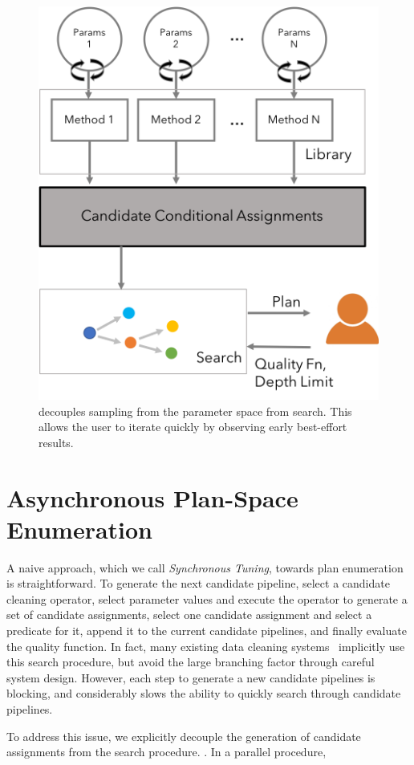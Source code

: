\begin{figure}[t]
\centering
 \includegraphics[width=0.7\columnwidth]{figures/architecture.png}
 \caption{\small \sys decouples sampling from the parameter space from search. This allows the user to iterate quickly by observing early best-effort results. \label{fig:arch}}
\end{figure}

\section{Asynchronous Plan-Space Enumeration}


A naive approach, which we call {\it Synchronous Tuning}, towards plan enumeration is straightforward.  To generate the next candidate pipeline, select a candidate cleaning operator, select parameter values and execute the operator to generate a set of candidate assignments, select one candidate assignment and select a predicate for it, append it to the current candidate pipelines, and finally evaluate the quality function.  In fact, many existing data cleaning systems~\cite{} implicitly use this search procedure, but avoid the large branching factor through careful system design.    However, each step to generate a new candidate pipelines is blocking, and considerably slows the ability to quickly search through candidate pipelines.  

To address this issue, we explicitly decouple the generation of candidate assignments from the search procedure.  \sys .  In a parallel procedure, 

